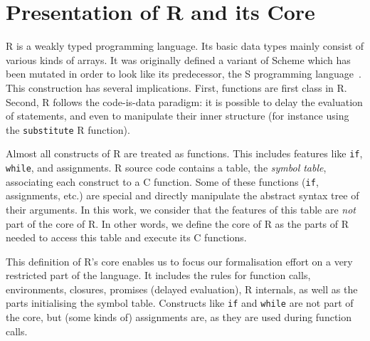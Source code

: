 \documentclass[9pt, sigplan, natbib=false, screen=true]{acmart}
\newcommand\R{R}
\newcommand\Cn{C}
\begin{document}
\section{Presentation of \R{} and its Core}
\label{sec:presentation}

\R{} is a weakly typed programming language.
Its basic data types mainly consist of various kinds of arrays.
It was originally defined a variant of Scheme
which has been mutated in order to look like its predecessor,
the S programming language~\parencite{ihaka1996r}.
This construction has several implications.
First, functions are first class in \R{}.
Second, \R{} follows the code-is-data paradigm:
it is possible to delay the evaluation of statements,
and even to manipulate their inner structure
(for instance using the \texttt{substitute} \R{} function).

Almost all constructs of \R{} are treated as functions.
This includes features like \texttt{if}, \texttt{while},
and assignments.
\R{} source code contains a table,
the \emph{symbol table},
associating each construct to a \Cn{} function.
Some of these functions (\texttt{if}, assignments, etc.)
are special and directly manipulate the abstract syntax tree
of their arguments.
%
In this work,
we consider that the features of this table
are \emph{not} part of the core of \R{}.
In other words, we define the core of \R{}
as the parts of \R{} needed to access this table
and execute its \Cn{} functions.

This definition of \R{}'s core enables us to focus
our formalisation effort on a very restricted part of the language.
It includes the rules for function calls,
environments, closures, promises (delayed evaluation), \R{} internals,
as well as the parts initialising the symbol table.
Constructs like \texttt{if} and \texttt{while}
are not part of the core,
but (some kinds of) assignments are,
as they are used during function calls.
\end{document}
